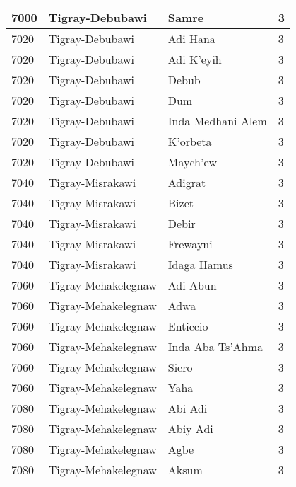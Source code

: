 \documentclass[12pt,a4paper,openbib,titlepage]{report}
\begin{document}
\begin{longtable}{|p{2cm}|p{6.5cm}|p{8cm}|p{1.5cm}|}
\hline 
\rule[-1ex]{0pt}{2.5ex} 7000 & Tigray-Debubawi & Samre & 3 \\
\hline 
\rule[-1ex]{0pt}{2.5ex} 7020 & Tigray-Debubawi & Adi Hana & 3 \\
\hline 
\rule[-1ex]{0pt}{2.5ex} 7020 & Tigray-Debubawi & Adi K'eyih & 3 \\
\hline 
\rule[-1ex]{0pt}{2.5ex} 7020 & Tigray-Debubawi & Debub & 3 \\
\hline 
\rule[-1ex]{0pt}{2.5ex} 7020 & Tigray-Debubawi & Dum & 3 \\
\hline 
\rule[-1ex]{0pt}{2.5ex} 7020 & Tigray-Debubawi & Inda Medhani Alem & 3 \\
\hline 
\rule[-1ex]{0pt}{2.5ex} 7020 & Tigray-Debubawi & K'orbeta & 3 \\
\hline 
\rule[-1ex]{0pt}{2.5ex} 7020 & Tigray-Debubawi & Maych'ew & 3 \\
\hline 
\rule[-1ex]{0pt}{2.5ex} 7040 & Tigray-Misrakawi & Adigrat & 3 \\
\hline 
\rule[-1ex]{0pt}{2.5ex} 7040 & Tigray-Misrakawi & Bizet & 3 \\
\hline 
\rule[-1ex]{0pt}{2.5ex} 7040 & Tigray-Misrakawi & Debir & 3 \\
\hline 
\rule[-1ex]{0pt}{2.5ex} 7040 & Tigray-Misrakawi & Frewayni & 3 \\
\hline 
\rule[-1ex]{0pt}{2.5ex} 7040 & Tigray-Misrakawi & Idaga Hamus & 3 \\
\hline 
\rule[-1ex]{0pt}{2.5ex} 7060 & Tigray-Mehakelegnaw & Adi Abun & 3 \\
\hline 
\rule[-1ex]{0pt}{2.5ex} 7060 & Tigray-Mehakelegnaw & Adwa & 3 \\
\hline 
\rule[-1ex]{0pt}{2.5ex} 7060 & Tigray-Mehakelegnaw & Enticcio & 3 \\
\hline 
\rule[-1ex]{0pt}{2.5ex} 7060 & Tigray-Mehakelegnaw & Inda Aba Ts'Ahma & 3 \\
\hline 
\rule[-1ex]{0pt}{2.5ex} 7060 & Tigray-Mehakelegnaw & Siero & 3 \\
\hline 
\rule[-1ex]{0pt}{2.5ex} 7060 & Tigray-Mehakelegnaw & Yaha & 3 \\
\hline 
\rule[-1ex]{0pt}{2.5ex} 7080 & Tigray-Mehakelegnaw & Abi Adi & 3 \\
\hline 
\rule[-1ex]{0pt}{2.5ex} 7080 & Tigray-Mehakelegnaw & Abiy Adi & 3 \\
\hline 
\rule[-1ex]{0pt}{2.5ex} 7080 & Tigray-Mehakelegnaw & Agbe & 3 \\
\hline 
\rule[-1ex]{0pt}{2.5ex} 7080 & Tigray-Mehakelegnaw & Aksum & 3 \\

\end{longtable}
\end{document}
